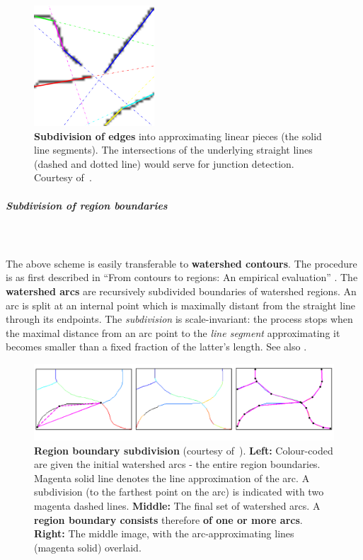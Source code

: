 \begin{figure}[t]
 \centering
 \includegraphics[width=0.4\textwidth,frame]{images/gPb-OWT-UCM/Maire2008using-contour-subdivision.png}
 \caption[Subdivision of edges: an image patch]{{\bf Subdivision of edges} %
 into approximating linear pieces (the solid line segments). The intersections of the underlying straight lines (dashed and dotted line) would serve for junction detection. Courtesy of~\cite{Maire2008using}.}
 \label{fig:Maire08using-contour-subdivision}
\end{figure}

\subparagraph{Subdivision of region boundaries}\mbox{}\\\mbox{}\\
The above scheme is easily transferable to {\bf watershed contours}. The procedure is as first described in ``From contours to regions: An empirical evaluation'' \cite{Arbelaez09}. The {\bf watershed arcs} are recursively subdivided boundaries of watershed regions. An arc is split at an internal point which is maximally distant from the straight line through %
its endpoints. The {\it subdivision} is scale-invariant: the process stops when the maximal distance from an arc point to the {\it line segment} approximating it becomes smaller than a fixed fraction of the latter's %
length. See also .

\begin{figure}[t]
 \centering
 \includegraphics[width=1\textwidth]{images/gPb-OWT-UCM/Arbelaez11-contour-subdivision.png}
 \caption[Region boundary subdivision]{{\bf Region boundary subdivision} (courtesy of~\cite{Arbelaez11}). {\bf Left:} Colour-coded are given the initial watershed arcs - the entire  %
 region boundaries. Magenta solid line denotes the line approximation of the arc. A subdivision (to the farthest point on the arc) is indicated with two magenta dashed lines. {\bf Middle:} The final set of watershed arcs. A {\bf region boundary consists} therefore {\bf of one or more arcs}. {\bf Right:} The middle image, with the arc-approximating lines (magenta solid) overlaid.}
 \label{fig:Arbelaez11-contour-subdivision}
\end{figure}

